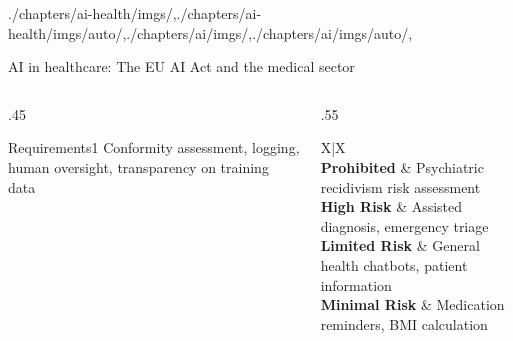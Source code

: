 \begin{graphicspathcontext}{{./chapters/ai-health/imgs/},{./chapters/ai-health/imgs/auto/},{./chapters/ai/imgs/},{./chapters/ai/imgs/auto/},\old}
\begin{frame}[t]{{AI in healthcare:} The EU AI Act and the medical sector}
	\begin{columns}
		\begin{column}{.45\linewidth}
			\vspace{.3cm}
			\begin{rightanchorblock}{Requirements}{1}
			Conformity assessment, logging, human oversight, transparency on training data
			\end{rightanchorblock}
		\end{column}
		\begin{column}{.55\linewidth}
			\begin{stabularx}{X|X}
			 \\
			\textbf{Prohibited} & Psychiatric recidivism risk assessment \\
			\hline
			\textbf{High Risk} & Assisted diagnosis, emergency triage \\
			\hline
			\textbf{Limited Risk} & General health chatbots, patient information \\
			\hline
			\textbf{Minimal Risk} & Medication reminders, BMI calculation \\
			\end{stabularx}
		\end{column}
	\end{columns}
\end{frame}

\end{graphicspathcontext}

\endinput
